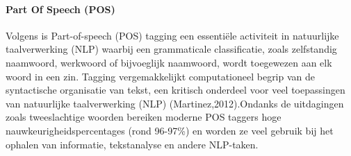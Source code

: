 \paragraph{Part Of Speech (POS)}
Volgens \textcite{Martinez2024} is Part-of-speech (POS) tagging een essentiële activiteit in natuurlijke taalverwerking (NLP) waarbij een grammaticale classificatie, zoals zelfstandig naamwoord, werkwoord of bijvoeglijk naamwoord, wordt toegewezen aan elk woord in een zin. Tagging vergemakkelijkt computationeel begrip van de syntactische organisatie van tekst, een kritisch onderdeel voor veel toepassingen van natuurlijke taalverwerking (NLP) (Martinez,2012).Ondanks de uitdagingen zoals tweeslachtige woorden bereiken moderne POS taggers hoge nauwkeurigheidspercentages (rond 96-97\%) en worden ze veel gebruik bij het ophalen van informatie, tekstanalyse en andere NLP-taken.

